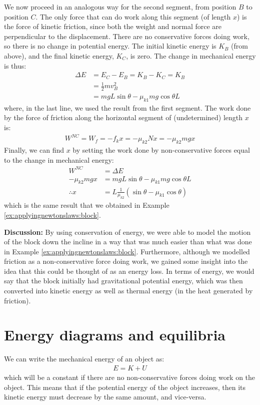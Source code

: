 \begin{example}
We now proceed in an analogous way for the second segment, from position $B$ to position $C$. The only force that can do work along this segment (of length $x$) is the force of kinetic friction, since both the weight and normal force are perpendicular to the displacement. There are no conservative forces doing work, so there is no change in potential energy. The initial kinetic energy is $K_B$ (from above), and the final kinetic energy, $K_C$, is zero. The change in mechanical energy is thus:
\begin{align*}
\Delta E &= E_C - E_B = K_B - K_C = K_B\\
&=\frac{1}{2}mv_B^2\\
&= mgL\sin\theta-\mu_{k1}mg\cos\theta L 
\end{align*}
where, in the last line, we used the result from the first segment. The work done by the force of friction along the horizontal segment of (undetermined) length $x$ is:
\begin{align*}
W^{NC}=W_f = -f_kx = -\mu_{k2} N x=-\mu_{k2} mg x
\end{align*}
Finally, we can find $x$ by setting the work done by non-conservative forces equal to the change in mechanical energy:
\begin{align*}
W^{NC} &= \Delta E\\
-\mu_{k2} mg x &= mgL\sin\theta-\mu_{k1}mg\cos\theta L \\
\therefore x&= L\frac{1}{\mu_{k2}}\left(\sin\theta - \mu_{k1}\cos\theta\right)
\end{align*}
which is the same result that we obtained in Example \ref{ex:applyingnewtonslaws:block}.

\textbf{Discussion:} By using conservation of energy, we were able to model the motion of the block down the incline in a way that was much easier than what was done in Example \ref{ex:applyingnewtonslaws:block}. Furthermore, although we modelled friction as a non-conservative force doing work, we gained some insight into the idea that this could be thought of as an energy loss. In terms of energy, we would say that the block initially had gravitational potential energy, which was then converted into kinetic energy as well as thermal energy (in the heat generated by friction). 
\end{example}

\section{Energy diagrams and equilibria}
\label{sec:potentialecons:ediagrams}
We can write the mechanical energy of an object as:
\begin{align*}
E = K + U
\end{align*}
which will be a constant if there are no non-conservative forces doing work on the object. This means that if the potential energy of the object increases, then its kinetic energy must decrease by the same amount, and vice-versa. 

